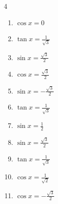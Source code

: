 \begin{multicols}{4}
\begin{enumerate}
  \item $\displaystyle \cos{x}  = 0$


  \item $\displaystyle \tan{x}  = \frac{1}{\sqrt{3}}$


  \item $\displaystyle \sin{x}  = \frac{\sqrt{3}}{2}$


  \item $\displaystyle \cos{x}  = \frac{\sqrt{3}}{2}$


  \item $\displaystyle \sin{x}  = -\frac{\sqrt{3}}{2}$


  \item $\displaystyle \tan{x}  = \frac{1}{\sqrt{3}}$


  \item $\displaystyle \sin{x}  = \frac{1}{2}$


  \item $\displaystyle \sin{x}  = \frac{\sqrt{3}}{2}$


  \item $\displaystyle \tan{x}  = \frac{1}{\sqrt{3}}$


  \item $\displaystyle \cos{x}  = \frac{1}{\sqrt{2}}$


  \item $\displaystyle \cos{x}  = -\frac{\sqrt{3}}{2}$



\end{enumerate}
\end{multicols}
